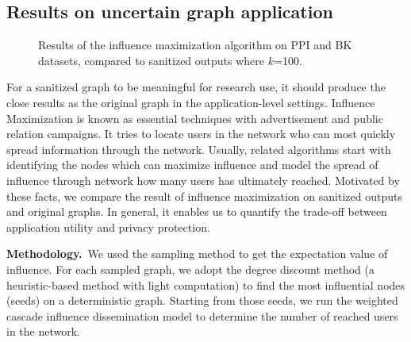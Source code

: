 \subsection{Results on uncertain graph application}
\begin{figure}[!htb]
    \centering
    \caption{ Results of the influence maximization algorithm on PPI and BK datasets, compared to sanitized outputs where $k$=100.}
    \vspace{-15pt}
    \label{fig:IM}
\end{figure} 
For a sanitized graph to be meaningful for research use, it should produce 
the close results as the original graph in the application-level settings. 
Influence Maximization is known as essential techniques with advertisement and public relation campaigns.
It tries to locate users in the network who can most quickly spread information through the network. 
Usually, related algorithms start with identifying the nodes which can maximize influence and model the spread of influence through network how many users has ultimately reached.  
Motivated by these facts, we compare the result of influence maximization on sanitized outputs and original graphs. 
In general, it enables us to quantify the trade-off between application utility and privacy protection. 

\textbf{Methodology.}~We used the sampling method to get the expectation value of influence. For each sampled graph, we adopt the degree discount method (a heuristic-based method with light computation) to find the most influential nodes (seeds) on a deterministic graph. Starting from those seeds, we run the weighted cascade influence dissemination model to determine the number of reached users in the network. 


